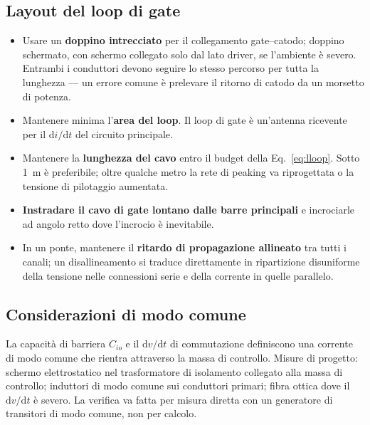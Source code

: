 \documentclass[11pt,a4paper]{article}
\begin{document}
\subsection{Layout del loop di gate}

\begin{itemize}
  \item Usare un \textbf{doppino intrecciato} per il collegamento gate--catodo;
        doppino schermato, con schermo collegato solo dal lato driver, se l'ambiente
        è severo. Entrambi i conduttori devono seguire lo stesso percorso per tutta
        la lunghezza --- un errore comune è prelevare il ritorno di catodo da un
        morsetto di potenza.
  \item Mantenere minima l'\textbf{area del loop}. Il loop di gate è un'antenna
        ricevente per il $\mathrm{d}i/\mathrm{d}t$ del circuito principale.
  \item Mantenere la \textbf{lunghezza del cavo} entro il budget della
        Eq.~\eqref{eq:lloop}. Sotto \SI{1}{\metre} è preferibile; oltre qualche metro
        la rete di peaking va riprogettata o la tensione di pilotaggio aumentata.
  \item \textbf{Instradare il cavo di gate lontano dalle barre principali} e
        incrociarle ad angolo retto dove l'incrocio è inevitabile.
  \item In un ponte, mantenere il \textbf{ritardo di propagazione allineato} tra
        tutti i canali; un disallineamento si traduce direttamente in ripartizione
        disuniforme della tensione nelle connessioni serie e della corrente in quelle
        parallelo.
\end{itemize}

\subsection{Considerazioni di modo comune}

La capacità di barriera $C_{io}$ e il $\mathrm{d}v/\mathrm{d}t$ di commutazione
definiscono una corrente di modo comune che rientra attraverso la massa di
controllo. Misure di progetto: schermo elettrostatico nel trasformatore di
isolamento collegato alla massa di controllo; induttori di modo comune sui
conduttori primari; fibra ottica dove il $\mathrm{d}v/\mathrm{d}t$ è severo. La
verifica va fatta per misura diretta con un generatore di transitori di modo comune,
non per calcolo.

\end{document}
